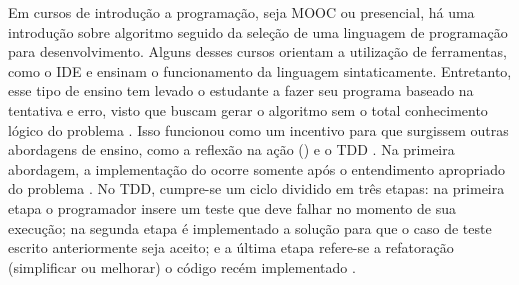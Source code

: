 	Em cursos de introdução a programação, seja \acs{MOOC} ou presencial, há uma introdução
	sobre algoritmo seguido da seleção de uma linguagem de programação para
	desenvolvimento. Alguns desses cursos orientam a utilização de ferramentas, como
	o \ac{IDE} e ensinam o funcionamento da linguagem sintaticamente.
	Entretanto, esse tipo de ensino tem levado o estudante a fazer seu programa baseado
	na tentativa e erro, visto que buscam gerar o algoritmo sem o total conhecimento
	lógico do problema \cite{edwards2003}. Isso funcionou como um incentivo para que
	surgissem outras abordagens de ensino, como a reflexão na ação () e o \ac{TDD} \cite{camara_graciottoSilva2016}. Na primeira abordagem, a
	implementação do  ocorre somente após o entendimento apropriado
	do problema \cite{edwards2004}. No \acs{TDD}, cumpre-se um ciclo dividido em três etapas:
	na primeira etapa o programador insere um teste que deve falhar no momento de sua
	execução; na segunda etapa é implementado a solução para que o caso de teste
	escrito anteriormente seja aceito; e a última etapa refere-se a refatoração
	(simplificar ou melhorar) o código recém implementado \cite{beck2003}.
